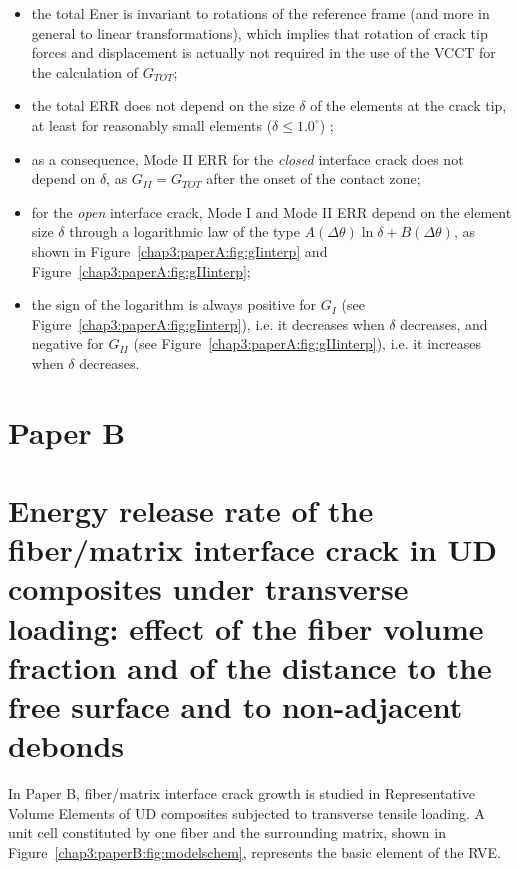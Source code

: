 \begin{itemize}
\item the total Ener is invariant to rotations of the reference frame (and more in general to linear transformations), which implies that rotation of crack tip forces and displacement is actually not required in the use of the VCCT for the calculation of $G_{TOT}$;
\item the total ERR does not depend on the size $\delta$ of the elements at the crack tip, at least for reasonably small elements ($\delta\leq1.0^{\circ}$) ;
\item as a consequence, Mode II ERR for the \emph{closed} interface crack does not depend on $\delta$, as $G_{II}=G_{TOT}$ after the onset of the contact zone;
\item for the \emph{open} interface crack, Mode I and Mode II ERR depend on the element size $\delta$ through a logarithmic law of the type $A\left(\Delta\theta\right)\ln\delta+B\left(\Delta\theta\right)$, as shown in Figure~\ref{chap3:paperA:fig:gIinterp} and Figure~\ref{chap3:paperA:fig:gIIinterp};
\item the sign of the logarithm is always positive for $G_{I}$ (see Figure~\ref{chap3:paperA:fig:gIinterp}), i.e. it decreases when $\delta$ decreases, and negative for $G_{II}$ (see Figure~\ref{chap3:paperA:fig:gIIinterp}), i.e. it increases when $\delta$ decreases.
\end{itemize}


\section{Paper B}\label{chap3:paperB}
\section*{Energy release rate of the fiber/matrix interface crack in UD composites under transverse loading: effect of the fiber volume fraction and of the distance to the free surface and to non-adjacent debonds}

In Paper B, fiber/matrix interface crack growth is studied in Representative Volume Elements of UD composites subjected to transverse tensile loading. A unit cell constituted by one fiber and the surrounding matrix, shown in Figure~\ref{chap3:paperB:fig:modelschem}, represents the basic element of the RVE.

